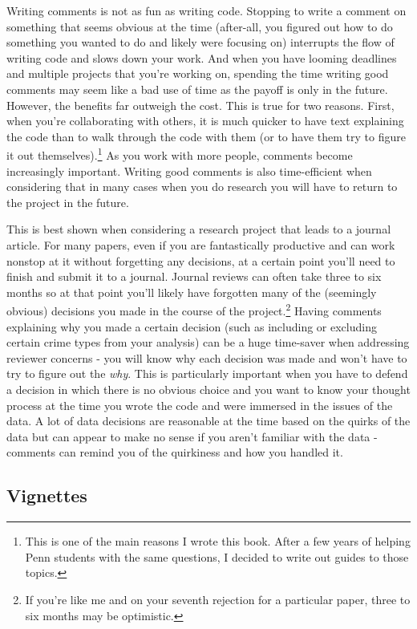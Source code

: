 \documentclass[
  a4paper,
]{krantz}
\begin{document}
Writing comments is not as fun as writing code. Stopping to
write a comment on something that seems obvious at the time
(after-all, you figured out how to do something you wanted
to do and likely were focusing on) interrupts the flow of
writing code and slows down your work. And when you have
looming deadlines and multiple projects that you're working
on, spending the time writing good comments may seem like a
bad use of time as the payoff is only in the future.
However, the benefits far outweigh the cost. This is true
for two reasons. First, when you're collaborating with
others, it is much quicker to have text explaining the code
than to walk through the code with them (or to have them try
to figure it out themselves).\footnote{This is one of the
  main reasons I wrote this book. After a few years of
  helping Penn students with the same questions, I decided
  to write out guides to those topics.} As you work with
more people, comments become increasingly important. Writing
good comments is also time-efficient when considering that
in many cases when you do research you will have to return
to the project in the future.

This is best shown when considering a research project that
leads to a journal article. For many papers, even if you are
fantastically productive and can work nonstop at it without
forgetting any decisions, at a certain point you'll need to
finish and submit it to a journal. Journal reviews can often
take three to six months so at that point you'll likely have
forgotten many of the (seemingly obvious) decisions you made
in the course of the project.\footnote{If you're like me and
  on your seventh rejection for a particular paper, three to
  six months may be optimistic.} Having comments explaining
why you made a certain decision (such as including or
excluding certain crime types from your analysis) can be a
huge time-saver when addressing reviewer concerns - you will
know why each decision was made and won't have to try to
figure out the \emph{why}. This is particularly important
when you have to defend a decision in which there is no
obvious choice and you want to know your thought process at
the time you wrote the code and were immersed in the issues
of the data. A lot of data decisions are reasonable at the
time based on the quirks of the data but can appear to make
no sense if you aren't familiar with the data - comments can
remind you of the quirkiness and how you handled it.

\hypertarget{vignettes}{%
\subsection{Vignettes}\label{vignettes}}
\end{document}
